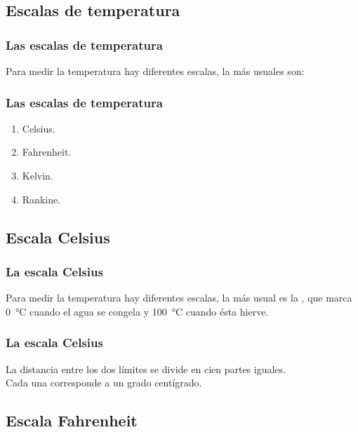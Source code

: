 \documentclass[14pt]{beamer}
\begin{document}
\subsection{Escalas de temperatura}

\begin{frame}
\frametitle{Las escalas de temperatura}
Para medir la temperatura hay diferentes escalas, la más usuales son:
\end{frame}
\begin{frame}
\frametitle{Las escalas de temperatura}
\begin{enumerate}[<+->]
\item Celsius.
\item Fahrenheit.
\item Kelvin.
\item Rankine.
\end{enumerate}
\end{frame}

\subsection{Escala Celsius}

\begin{frame}
\frametitle{La escala Celsius}
Para medir la temperatura hay diferentes escalas, la más usual es la , \pause que marca \SI{0}{\degreeCelsius} cuando el agua se congela \pause y \SI{100}{\degreeCelsius} cuando ésta hierve.
\end{frame}
\begin{frame}
\frametitle{La escala Celsius}
La distancia entre los dos límites se divide en cien partes iguales. 
\\
\bigskip
\pause
Cada una corresponde a un grado centígrado.
\end{frame}

\subsection{Escala Fahrenheit}
\end{document}
